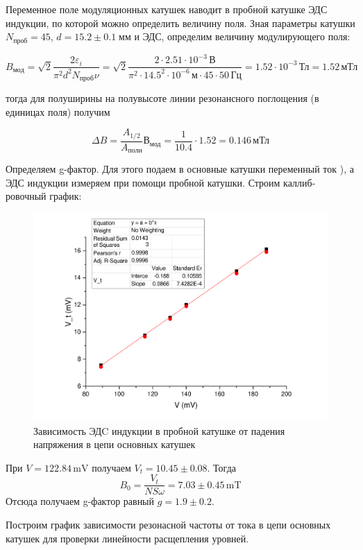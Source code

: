 \documentclass[a4paper,12pt]{article}
\theoremstyle{plain} %
\theoremstyle{definition} %
\theoremstyle{remark} %
\begin{document}
Переменное поле модуляционных катушек наводит в пробной катушке ЭДС индукции,
по которой можно определить величину поля. 
Зная параметры катушки $N_{проб} = 45$, $d = 15.2 \pm 0.1 \; мм$ и ЭДС, определим величину модулирующего поля:


\begin{equation}
B_{мод} = \sqrt{2} \frac{2\varepsilon_i}{\pi^2 d^2N_{проб} \nu} = \sqrt{2} \frac{2 \cdot 2.51 \cdot 10^{-3}\, \text{В}}{\pi^2 \cdot 14.5^2 \cdot 10^{-6} \, \text{м} \cdot 45 \cdot 50\, \text{Гц}}  = 1.52 \cdot 10^{-3} \,\text{Тл} = 1.52 \, \text{мТл}
\end{equation}

тогда для полуширины на полувысоте линии резонансного поглощения (в единицах поля) получим

\begin{equation}
\Delta B  = \frac{A_{1/2}}{A_{\text{полн}}} В_{\text{мод}} = \frac{1}{10.4}\cdot 1.52 = 0.146 \,\text{мТл}  
\end{equation}

Определяем g-фактор. Для этого подаем в основные катушки переменный ток 
), а ЭДС индукции измеряем при помощи пробной катушки. Строим каллиб-
ровочный график:
\begin{figure}
    \centering
    \includegraphics[width = 0.6\linewidth]{cal}
    \caption{ Зависимость ЭДC индукции в пробной катушке от падения напряжения в цепи основных катушек}
    \label{fig:my_label}
\end{figure}
    
    При $V = 122.84\,\mathrm{mV}$ получаем $V_t = 10.45\pm0.08$. Тогда
    \begin{equation}
        B_0 = \frac{V_t}{NS\omega} = 7.03\pm 0.45\,\mathrm{mT}
    \end{equation}
    Отсюда получаем g-фактор равный $g = 1.9\pm 0.2$.
    
    Построим график зависимости резонасной частоты от тока в цепи основных катушек для проверки линейности расщепления уровней.
    
\end{document}
